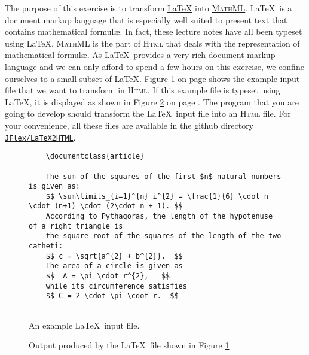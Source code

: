 \exerciseEng
The purpose of this exercise is to transform \href{http://www.latex-project.org}{\LaTeX} into 
\href{https://www.tutorialspoint.com/mathml/index.htm}{\textsc{MathML}}.  \LaTeX\ is a document markup language
that is especially well suited to present text that contains mathematical formul\ae.  In fact, these
lecture notes have all been typeset using \LaTeX.  \textsc{MathML} is the part of \textsc{Html} that
deals with the representation of mathematical formul\ae.  As \LaTeX\ provides a very rich
document markup language and we can only afford to spend a few hours on this exercise, we confine
ourselves to a small subset of \LaTeX.  Figure \ref{fig:input.tex} on page \pageref{fig:input.tex}
shows the example input file that we want to transform in \textsc{Html}.  If this example file is
typeset using \LaTeX, it is displayed as shown in Figure \ref{fig:input.pdf} on page
\pageref{fig:input.pdf}.  The program that you are
going to develop should transform the \LaTeX\ input file into an \textsc{Html} file.  For your
convenience, all these files are available in the github directory 
\\[0.2cm]
\hspace*{1.3cm}
\href{https://github.com/karlstroetmann/Formal-Languages/tree/master/JFlex/LaTeX2HTML}{\texttt{JFlex/LaTeX2HTML}}.

\begin{figure}[!ht]
  \centering
\begin{verbatim}
    \documentclass{article}
    
    The sum of the squares of the first $n$ natural numbers is given as:
    $$ \sum\limits_{i=1}^{n} i^{2} = \frac{1}{6} \cdot n \cdot (n+1) \cdot (2\cdot n + 1). $$
    According to Pythagoras, the length of the hypotenuse of a right triangle is
    the square root of the squares of the length of the two catheti:
    $$ c = \sqrt{a^{2} + b^{2}}.  $$
    The area of a circle is given as 
    $$  A = \pi \cdot r^{2},   $$ 
    while its circumference satisfies
    $$ C = 2 \cdot \pi \cdot r.  $$
    
    \end{verbatim}
  \caption{An example \LaTeX\ input file.}
  \label{fig:input.tex}
\end{figure}

\begin{figure}[!ht]
  \centering
  \caption{Output produced by the \LaTeX\ file shown in Figure \ref{fig:input.tex}}
  \label{fig:input.pdf}
\end{figure}

